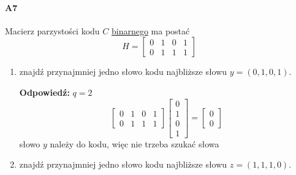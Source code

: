 \documentclass[a4paper,12pt]{article}
\theoremstyle{definition}%
\theoremstyle{definition}
\theoremstyle{problem}
\begin{document}
\paragraph{A7} Macierz parzystości kodu $C$ \underline{binarnego} ma postać
$$H =
\begin{bmatrix}
0& 1& 0& 1\\
0& 1& 1& 1 
\end{bmatrix}$$
\begin{enumerate}[label=\alph*)]
\item znajdź przynajmniej jedno słowo kodu najbliższe słowu $y = (0, 1, 0, 1)$.

\textbf{Odpowiedź: }$q=2$
$$\begin{bmatrix}
0& 1& 0& 1\\
0& 1& 1& 1 
\end{bmatrix}\begin{bmatrix}
0\\1\\0\\1
\end{bmatrix}=\begin{bmatrix}
0\\0
\end{bmatrix}$$
słowo $y$ należy do kodu, więc nie trzeba szukać słowa 
\item znajdź przynajmniej jedno słowo kodu najbliższe słowu $z = (1, 1, 1, 0)$.


\end{enumerate}
\end{document}

